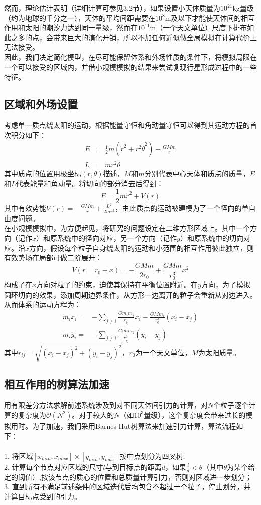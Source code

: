 \documentclass[hidelinks]{article}
\begin{document}
然而，理论估计表明（详细计算可参见3.2节），如果设置小天体质量为$10^{21}$kg量级（约为地球的千分之一），天体的平均间距需要在$10^8$m及以下才能使天体间的相互作用和太阳的潮汐力达到同一量级，然而在$10^{11}$m（一个天文单位）尺度下排布如此之多的点，会带来巨大的演化开销，所以不加任何近似做全局模拟在计算代价上无法接受。\\

因此，我们决定简化模型，在尽可能保留体系和外场性质的条件下，将模拟局限在一个可以接受的区域内，并借小规模模拟的结果来尝试复现行星形成过程中的一些特征。
\subsection{区域和外场设置}
考虑单一质点绕太阳的运动，根据能量守恒和角动量守恒可以得到其运动方程的首次积分如下：
\begin{align*}
    E = &\frac{1}{2}m(\dot{r}^2 + r^2\dot{\theta}^2) - \frac{GMm}{r}\\
    L = &mr^2\dot{\theta}
\end{align*}
其中质点的位置用极坐标$(r,\theta)$描述，$M$和$m$分别代表中心天体和质点的质量，$E$和$L$代表能量和角动量。将切向的部分消去后得到：
$$
E = \frac{1}{2}m\dot{r}^2 + V(r)
$$
其中有效势能$V(r) = - \frac{GMm}{r}+\frac{L^2}{2mr^2}$，由此质点的运动被建模为了一个径向的单自由度问题。\\
在小规模模拟中，为方便起见，将研究的问题设定在二维方形区域上。其中一个方向（记作$x$）和原系统中的径向对应，另一个方向（记作$y$）和原系统中的切向对应。沿$x$方向，假设每个粒子自身绕太阳的运动和小范围的相互作用彼此独立，则有效势场在局部可做二阶展开：
$$
V(r=r_0+x) = -\frac{GMm}{2r_0}+\frac{GMm}{r_0^3}x^2
$$
构成了在$x$方向对粒子的约束，迫使其保持在平衡位置附近。在$y$方向，为了模拟圆环切向的效果，添加周期边界条件，从方形一边离开的粒子会重新从对边进入。\\

从而体系的运动方程为：
\begin{align*}
    m_i\ddot{x_i} = &-\sum_{j\neq i}\frac{Gm_im_j}{r_{ij}^3}x_i-\frac{GMm_i}{r_0^3}(x_i-x_j)\\
    m_i\ddot{y_i} = &-\sum_{j\neq i}\frac{Gm_im_j}{r_{ij}^3}(y_i-y_j)
\end{align*}
其中$r_{ij}=\sqrt{(x_i-x_j)^2+(y_i-y_j)^2}$，$r_0$为一个天文单位，$M$为太阳质量。
\subsection{相互作用的树算法加速}
用有限差分方法求解前述系统涉及到对不同天体间引力的计算，对$N$个粒子逐个计算的复杂度为$\mathcal{O}(N^2)$。对于较大的$N$（如$10^3$量级），这个复杂度会带来过长的模拟用时。为了加速，我们采用Barnes-Hut树算法来加速引力计算，算法流程如下：\\
\\
1. 将区域$[x_{min}, x_{max}]\times[y_{min}, y_{max}]$按中点划分为四叉树;\\
2. 计算每个节点对应区域的尺寸$l$与到目标点的距离$d$，如果$\frac{l}{d}<\theta$（其中$\theta$为某个给定的阈值）,按该节点的质心的位置和总质量计算引力，否则对区域进一步划分；\\
3. 直到所有不满足前述条件的区域迭代后均包含不超过一个粒子，停止划分，并计算目标点受到的引力。\\
\end{document}
